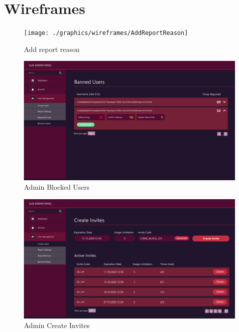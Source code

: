 
\chapter{Wireframes}\label{ch:wireframes}

\begin{figure}[h]
    \centering
    \texttt{[image: ./graphics/wireframes/AddReportReason]}
    \caption{Add report reason}
    \label{fig:figure6}
\end{figure}

\begin{figure}[h]
    \centering
    \includegraphics[width=1.0\textwidth]{./graphics/wireframes/AdminBlockedUsers}
    \caption{Admin Blocked Users}
    \label{fig:figure7}
\end{figure}

\begin{figure}[h]
    \centering
    \includegraphics[width=1.0\textwidth]{./graphics/wireframes/AdminCreateInvites}
    \caption{Admin Create Invites}
    \label{fig:figure8}
\end{figure}

